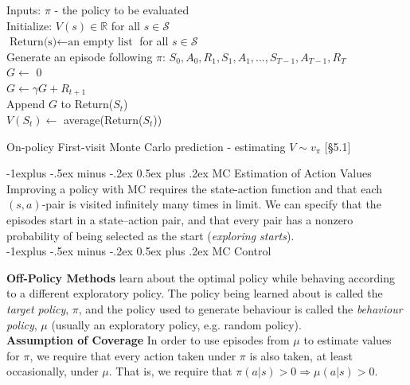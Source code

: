 \documentclass[10pt,landscape]{article}
\makeatletter
\renewcommand{\subsection}{\@startsection{subsection}{2}{0mm}%
                                {-1explus -.5ex minus -.2ex}%
                                {0.5ex plus .2ex}%
                                {\normalfont\normalsize\bfseries}}
\makeatother
\begin{document}
\begin{multicols}{3}
\begin{algorithm}[H]
Inputs: $\pi$ - the policy to be evaluated \\
Initialize: $V(s) \in \mathbb{R}$ for all $s \in \mathcal{S}$ \\
$\text{Return(s)} \leftarrow \text{an empty list}$ for all $s \in \mathcal{S}$ \\
{
    Generate an episode following $\pi$: $S_0, A_0, R_1, S_1, A_1,..., S_{T-1}, A_{T-1}, R_T$\\
    $G \leftarrow$ 0 \\
    {
    	$G \leftarrow \gamma G + R_{t+1}$\\
        {
        	Append $G$ to Return($S_t$)\\
        	$V(S_t) \leftarrow$ average(Return($S_t$))
        }
    }
 }
\caption{On-policy First-visit Monte Carlo prediction - estimating $V \sim v_{\pi}$ [§5.1]}
\end{algorithm}



\subsection{MC Estimation of Action Values}
Improving a policy with MC requires the state-action function and that each $(s,a)$-pair is visited infinitely many times in limit. We can specify that the episodes start in a state–action pair, and that every pair has a nonzero probability of being selected as the start (\emph{exploring starts}). \\

\subsection{MC Control}

\textbf{Off-Policy Methods} learn about the optimal policy while behaving according to a different exploratory policy. The policy being learned about is called the \emph{target policy}, $\pi$, and the policy used to generate behaviour is called the \emph{behaviour policy}, $\mu$ (usually an exploratory policy, e.g. random policy). \\

\textbf{Assumption of Coverage} In order to use episodes from $\mu$ to estimate values for $\pi$, we require that every action taken under $\pi$ is also taken, at least occasionally, under $\mu$. That is, we require that $\pi(a|s) > 0 \Rightarrow \mu(a|s) > 0$.


\end{multicols}
\end{document}
